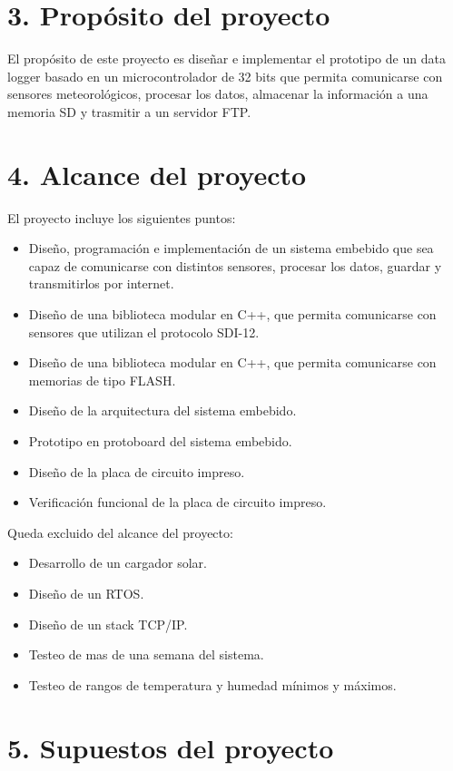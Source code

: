 \documentclass[
11pt, %
codirector, %
]{charter}
\begin{document}
\section{3. Propósito del proyecto}
\label{sec:proposito}

El propósito de este proyecto es diseñar e implementar el prototipo de un data logger basado en un microcontrolador de 32 bits que permita comunicarse con sensores meteorológicos, procesar los datos, almacenar la información a una memoria SD y trasmitir a un servidor FTP.

\section{4. Alcance del proyecto}
\label{sec:alcance}

El proyecto incluye los siguientes puntos:
\begin{itemize}
\item Diseño, programación e implementación de un sistema embebido que sea capaz de comunicarse con distintos sensores, procesar los datos, guardar y transmitirlos por internet.
\item Diseño de una biblioteca modular en C++, que permita comunicarse con sensores que utilizan el protocolo SDI-12.
\item Diseño de una biblioteca modular en C++, que permita comunicarse con memorias de tipo FLASH.
\item Diseño de la arquitectura del sistema embebido.
\item Prototipo en protoboard del sistema embebido.
\item Diseño de la placa de circuito impreso.
\item Verificación funcional de la placa de circuito impreso.
\end{itemize}

Queda excluido del alcance del proyecto:
\begin{itemize}
\item Desarrollo de un cargador solar.
\item Diseño de un RTOS.
\item Diseño de un stack TCP/IP.
\item Testeo de mas de una semana del sistema.
\item Testeo de rangos de temperatura y humedad mínimos y máximos.
\end{itemize}


\section{5. Supuestos del proyecto}
\label{sec:supuestos}
\end{document}
